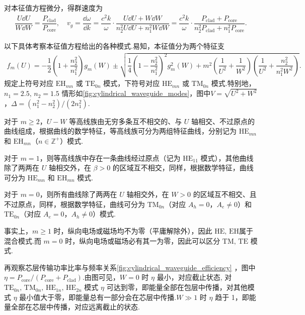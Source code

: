 对本征值方程微分，得群速度为
\begin{align*}
	\dfrac{U \dd U}{W \dd W} = \dfrac{P_{\text{clad}}}{P_{\text{core}}}, \quad v_g = \dfrac{\dd \omega}{\dd k} = \dfrac{c^2 k}{\omega} \cdot \dfrac{U \dd U + W \dd W}{n_2^2 U \dd U + n_1^2 W \dd W} = \dfrac{c^2 k}{\omega} \cdot \dfrac{P_{\text{clad}} + P_{\text{core}}}{n_2^2 P_{\text{clad}} + n_1^2 P_{\text{core}}}.
\end{align*}

以下具体考察本征值方程给出的各种模式.易知，本征值分为两个特征支
\begin{align*}
	f_m(U) = -\dfrac{1}{2} \left( 1 + \dfrac{n_2^2}{n_1^2} \right) g_m(W) \pm \sqrt{\dfrac{1}{4} \left( 1 - \dfrac{n_2^2}{n_1^2} \right)^2 g_m^2(W) + m^2 \left( \dfrac{1}{U^2} + \dfrac{1}{W^2} \right) \left( \dfrac{1}{U^2} + \dfrac{n_2^2}{n_1^2 W^2} \right)}.
\end{align*}
规定上符号对应 \(\mathrm{EH}_{mn}\) 或 \(\mathrm{TE}_{0n}\) 模式，下符号对应 \(\mathrm{HE}_{mn}\) 或 \(\mathrm{TM}_{0n}\) 模式.特别地，\(n_1 = 2.5,\,n_2 = 1.5\) 情形如\cref{fig:cylindrical_waveguide_modes}，图中\(V = \sqrt{U^2 + W^2}\)，\(\Delta = (n_1^2 - n_2^2)/(2 n_1^2)\).

对于 \(m \geq 2\)，\(U-W\) 等高线族由无穷多条互不相交的、与 \(U\) 轴相交、不过原点的曲线组成，根据曲线的数学特征，等高线族可分为两组特征曲线，分别记为 \(\mathrm{HE}_{mn}\) 和 \(\mathrm{EH}_{mn}\)（\(n \in \mathbb{Z}^+\)）模式.

对于 \(m = 1\)，则等高线族中存在一条曲线经过原点（记为 \(\mathrm{HE}_{11}\) 模式），其他曲线除了两两在 \(U\) 轴相交外，在 \(\beta > 0\) 的区域互不相交，同样，根据数学特征，曲线可分为 \(\mathrm{HE}_{mn}\) 和 \(\mathrm{EH}_{mn}\) 模式.

对于 \(m = 0\)，则所有曲线除了两两在 \(U\) 轴相交外，在 \(W > 0\) 的区域互不相交、且不过原点，同样，根据数学特征，曲线可分为 \(\mathrm{TM}_{0n}\)（对应 \(A_h = 0\)，\(A_e \neq 0\)）和 \(\mathrm{TE}_{0n}\)（对应 \(A_e = 0\)，\(A_h \neq 0\)）模式.

事实上，\(m \geq 1\) 时，纵向电场或磁场均不为零（平庸解除外），因此 \(\mathrm{HE},\,\mathrm{EH}\)属于混合模式.而 \(m = 0\) 时，纵向电场或磁场必有其一为零，因此可以区分 \(\mathrm{TM},\,\mathrm{TE}\) 模式.

再观察芯层传输功率比率与频率关系\cref{fig:cylindrical_waveguide_efficiency} ，图中 \(\eta =P_{\text{core}}/(P_{\text{core}} + P_{\text{clad}})\).由图可见，\(W = 0\) 时 \(\eta\) 最小，对应截止状态, 对 \(\mathrm{TE}_{0n},\,\mathrm{TM}_{0n},\,\mathrm{HE}_{1n},\,\mathrm{HE}_{2n}\) 模式 \(\eta\) 可达到零，即能量全部在包层中传播，对其他模式 \(\eta\) 最小值大于零，即能量总有一部分会在芯层中传播.\(W \gg 1\) 时 \(\eta\) 趋于 1，即能量全部在芯层中传播，对应远离截止的状态.

